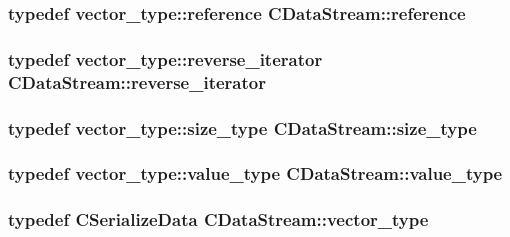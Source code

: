 \subsubsection[{reference}]{\setlength{\rightskip}{0pt plus 5cm}typedef vector\+\_\+type\+::reference {\bf C\+Data\+Stream\+::reference}}\label{class_c_data_stream_a33723921305add93b45973243faf1541}
\hypertarget{class_c_data_stream_a93ca1c317b7080997a20b0cf1920b39c}{}
\subsubsection[{reverse\+\_\+iterator}]{\setlength{\rightskip}{0pt plus 5cm}typedef vector\+\_\+type\+::reverse\+\_\+iterator {\bf C\+Data\+Stream\+::reverse\+\_\+iterator}}\label{class_c_data_stream_a93ca1c317b7080997a20b0cf1920b39c}
\hypertarget{class_c_data_stream_a79e10daad6db0f94aea1e811eb167378}{}
\subsubsection[{size\+\_\+type}]{\setlength{\rightskip}{0pt plus 5cm}typedef vector\+\_\+type\+::size\+\_\+type {\bf C\+Data\+Stream\+::size\+\_\+type}}\label{class_c_data_stream_a79e10daad6db0f94aea1e811eb167378}
\hypertarget{class_c_data_stream_a5572ddd57b7355f87781b89087dd18e0}{}
\subsubsection[{value\+\_\+type}]{\setlength{\rightskip}{0pt plus 5cm}typedef vector\+\_\+type\+::value\+\_\+type {\bf C\+Data\+Stream\+::value\+\_\+type}}\label{class_c_data_stream_a5572ddd57b7355f87781b89087dd18e0}
\hypertarget{class_c_data_stream_a5e86187632a0d6cea39f3ea525427e27}{}
\subsubsection[{vector\+\_\+type}]{\setlength{\rightskip}{0pt plus 5cm}typedef C\+Serialize\+Data {\bf C\+Data\+Stream\+::vector\+\_\+type}\hspace{0.3cm}{\ttfamily [protected]}}\label{class_c_data_stream_a5e86187632a0d6cea39f3ea525427e27}


